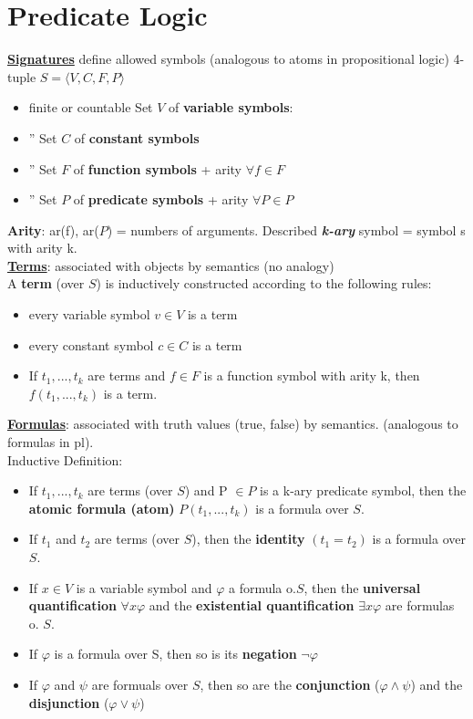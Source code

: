 \section*{Predicate Logic}
\textbf{\underline{Signatures}} define allowed symbols (analogous to atoms in propositional logic) 
4-tuple $S = \langle V, C, F, P \rangle$ \\
\begin{itemize}[noitemsep,topsep=0pt,leftmargin=*]
    \item finite or countable Set $V$ of \textbf{variable symbols}: %
    \item '' Set $C$ of \textbf{constant symbols}
    \item '' Set $F$ of \textbf{function symbols} + arity $\forall f \in F$ 
    \item '' Set $P$ of \textbf{predicate symbols} + arity $\forall P \in P$ %
\end{itemize}
\textbf{Arity}: ar(f), ar($P$) = numbers of arguments. Described \textit{\textbf{k-ary}} symbol = symbol s with arity k. \\ 
\textbf{\underline{Terms}}: associated with objects by semantics (no analogy) \\
A \textbf{term} (over $S$) is inductively constructed according to the following rules: 
\begin{itemize}[noitemsep,topsep=0pt,leftmargin=*]
    \item every variable symbol $v \in V$ is a term 
    \item every constant symbol $c \in C$ is a term 
    \item If $t_1,..., t_k$ are terms and $f\in F$ is a function symbol with arity k, then $f(t_1,..., t_k)$ is a term.
\end{itemize}
\textbf{\underline{Formulas}}: associated with truth values (true, false) by semantics. (analogous to formulas in pl). \\
Inductive Definition: 
\begin{itemize}[noitemsep,topsep=0pt,leftmargin=*]
    \item If $t_1,..., t_k$ are terms (over $S$) and P $
    \in P$ is a k-ary predicate symbol, then the \textbf{atomic formula (atom)} $P(t_1,..., t_k)$ is a formula over $S$.
    \item If $t_1$ and $t_2$ are terms (over $S$), then the \textbf{identity} $(t_1 = t_2)$ is a formula over $S$.
    \item If $x\in V$ is a variable symbol and $\varphi$ a formula o.$S$, then the \textbf{universal quantification} $\forall x \varphi$ and the \textbf{existential quantification} $\exists x \varphi$ are formulas o. $S$.
    \item If $\varphi$ is a formula over S, then so is its \textbf{negation} $\neg \varphi$ 
    \item If $\varphi$ and $\psi$ are formuals over $S$, then so are the \textbf{conjunction} ($\varphi \wedge \psi$) and the \textbf{disjunction} ($\varphi \vee \psi$)\\
\end{itemize}
